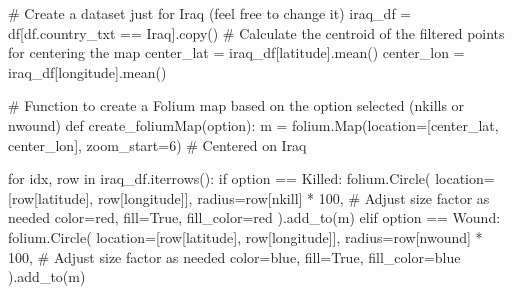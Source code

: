 \documentclass[
  letterpaper,
  DIV=11,
  numbers=noendperiod]{scrreprt}
\newenvironment{Shaded}{\begin{snugshade}}{\end{snugshade}}
\newcommand{\CommentTok}[1]{\textcolor[rgb]{0.37,0.37,0.37}{#1}}
\newcommand{\ControlFlowTok}[1]{\textcolor[rgb]{0.00,0.23,0.31}{#1}}
\newcommand{\DecValTok}[1]{\textcolor[rgb]{0.68,0.00,0.00}{#1}}
\newcommand{\KeywordTok}[1]{\textcolor[rgb]{0.00,0.23,0.31}{#1}}
\newcommand{\NormalTok}[1]{\textcolor[rgb]{0.00,0.23,0.31}{#1}}
\newcommand{\OperatorTok}[1]{\textcolor[rgb]{0.37,0.37,0.37}{#1}}
\newcommand{\StringTok}[1]{\textcolor[rgb]{0.13,0.47,0.30}{#1}}
\newcommand{\VariableTok}[1]{\textcolor[rgb]{0.07,0.07,0.07}{#1}}
\begin{document}
\begin{Shaded}
\begin{Highlighting}[]
\CommentTok{\# Create a dataset just for Iraq (feel free to change it)}
\NormalTok{iraq\_df }\OperatorTok{=}\NormalTok{ df[df.country\_txt }\OperatorTok{==} \StringTok{\textquotesingle{}Iraq\textquotesingle{}}\NormalTok{].copy()}
\CommentTok{\# Calculate the centroid of the filtered points for centering the map}
\NormalTok{center\_lat }\OperatorTok{=}\NormalTok{ iraq\_df[}\StringTok{\textquotesingle{}latitude\textquotesingle{}}\NormalTok{].mean()}
\NormalTok{center\_lon }\OperatorTok{=}\NormalTok{ iraq\_df[}\StringTok{\textquotesingle{}longitude\textquotesingle{}}\NormalTok{].mean()}

\CommentTok{\# Function to create a Folium map based on the option selected (nkills or nwound)}
\KeywordTok{def}\NormalTok{ create\_foliumMap(option):}
\NormalTok{    m }\OperatorTok{=}\NormalTok{ folium.Map(location}\OperatorTok{=}\NormalTok{[center\_lat, center\_lon], zoom\_start}\OperatorTok{=}\DecValTok{6}\NormalTok{)  }\CommentTok{\# Centered on Iraq}

    \ControlFlowTok{for}\NormalTok{ idx, row }\KeywordTok{in}\NormalTok{ iraq\_df.iterrows():}
        \ControlFlowTok{if}\NormalTok{ option }\OperatorTok{==} \StringTok{\textquotesingle{}Killed\textquotesingle{}}\NormalTok{:}
\NormalTok{            folium.Circle(}
\NormalTok{                location}\OperatorTok{=}\NormalTok{[row[}\StringTok{\textquotesingle{}latitude\textquotesingle{}}\NormalTok{], row[}\StringTok{\textquotesingle{}longitude\textquotesingle{}}\NormalTok{]],}
\NormalTok{                radius}\OperatorTok{=}\NormalTok{row[}\StringTok{\textquotesingle{}nkill\textquotesingle{}}\NormalTok{] }\OperatorTok{*} \DecValTok{100}\NormalTok{,  }\CommentTok{\# Adjust size factor as needed}
\NormalTok{                color}\OperatorTok{=}\StringTok{\textquotesingle{}red\textquotesingle{}}\NormalTok{,}
\NormalTok{                fill}\OperatorTok{=}\VariableTok{True}\NormalTok{,}
\NormalTok{                fill\_color}\OperatorTok{=}\StringTok{\textquotesingle{}red\textquotesingle{}}
\NormalTok{            ).add\_to(m)}
        \ControlFlowTok{elif}\NormalTok{ option }\OperatorTok{==} \StringTok{\textquotesingle{}Wound\textquotesingle{}}\NormalTok{:}
\NormalTok{            folium.Circle(}
\NormalTok{                location}\OperatorTok{=}\NormalTok{[row[}\StringTok{\textquotesingle{}latitude\textquotesingle{}}\NormalTok{], row[}\StringTok{\textquotesingle{}longitude\textquotesingle{}}\NormalTok{]],}
\NormalTok{                radius}\OperatorTok{=}\NormalTok{row[}\StringTok{\textquotesingle{}nwound\textquotesingle{}}\NormalTok{] }\OperatorTok{*} \DecValTok{100}\NormalTok{,  }\CommentTok{\# Adjust size factor as needed}
\NormalTok{                color}\OperatorTok{=}\StringTok{\textquotesingle{}blue\textquotesingle{}}\NormalTok{,}
\NormalTok{                fill}\OperatorTok{=}\VariableTok{True}\NormalTok{,}
\NormalTok{                fill\_color}\OperatorTok{=}\StringTok{\textquotesingle{}blue\textquotesingle{}}
\NormalTok{            ).add\_to(m)}


\end{Highlighting}
\end{Shaded}
\end{document}

